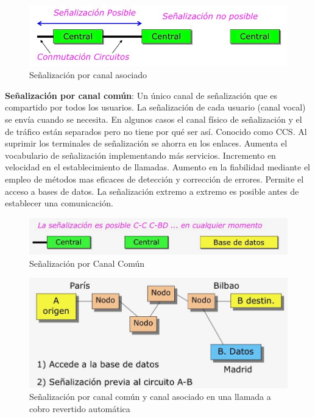 \documentclass[10pt,portrait, twocolumn]{article}
\begin{document}
	\begin{figure}[!ht]
 		\centering
  		 \includegraphics[scale = 0.4]{images/SenalizacionAsociado}
		\caption{Señalización por canal asociado}
	\end{figure}

\textbf{Señalización por canal común}: Un único canal de señalización que es compartido por todos los usuarios. La señalización de cada usuario (canal vocal) se envía cuando se necesita. En algunos casos el canal físico de señalización y el de tráfico están separados pero no tiene por qué ser así. Conocido como CCS. Al suprimir los terminales de señalización se ahorra en los enlaces. Aumenta el vocabulario de señalización implementando más servicios. Incremento en velocidad en el establecimiento de llamadas. Aumento en la fiabilidad mediante el empleo de métodos mas eficaces de detección y corrección de errores. Permite el acceso a bases de datos. La señalización extremo a extremo es posible antes de establecer una comunicación.
	
	\begin{figure}[!ht]
 		\centering
  		 \includegraphics[scale = 0.4]{images/SenalizacionComun}
		\caption{Señalización por Canal Común}
	\end{figure}

	\begin{figure}[!ht]
 		\centering
  		 \includegraphics[scale = 0.4]{images/CobroRevertido}
		\caption{Señalización por canal común y canal asociado en una llamada a cobro revertido automática}
	\end{figure}
\end{document}
